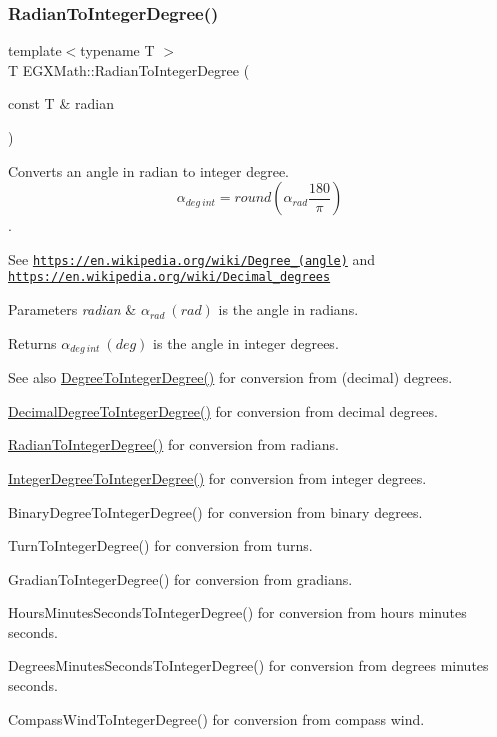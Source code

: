 \subsubsection{\texorpdfstring{Radian\+To\+Integer\+Degree()}{RadianToIntegerDegree()}}
{\footnotesize\ttfamily template$<$typename T $>$ \\
T E\+G\+X\+Math\+::\+Radian\+To\+Integer\+Degree (\begin{DoxyParamCaption}\item[{const T \&}]{radian }\end{DoxyParamCaption})}



Converts an angle in radian to integer degree. \[\alpha_{deg\ int}=round(\alpha_{rad}\frac{180}{\pi})\]. 

See \href{https://en.wikipedia.org/wiki/Degree_(angle)}{\tt https\+://en.\+wikipedia.\+org/wiki/\+Degree\+\_\+(angle)} and \href{https://en.wikipedia.org/wiki/Decimal_degrees}{\tt https\+://en.\+wikipedia.\+org/wiki/\+Decimal\+\_\+degrees} 
\begin{DoxyParams}{Parameters}
{\em radian} & $\alpha_{rad}\ (rad)$ is the angle in radians. \\
\hline
\end{DoxyParams}
\begin{DoxyReturn}{Returns}
$\alpha_{deg\ int}\ (deg)$ is the angle in integer degrees. 
\end{DoxyReturn}
\begin{DoxySeeAlso}{See also}
\mbox{\hyperlink{group___e_g_x_math-_angle_conversions-_degree_gaabd20f21be3c18ee423d0bc1a677c6f6}{Degree\+To\+Integer\+Degree()}} for conversion from (decimal) degrees. 

\mbox{\hyperlink{group___e_g_x_math-_angle_conversions-_decimal_degree_ga115239ea7202dbc6a6c9fba68e0ac189}{Decimal\+Degree\+To\+Integer\+Degree()}} for conversion from decimal degrees. 

\mbox{\hyperlink{group___e_g_x_math-_angle_conversions-_radian_gac84796dfdeb56235e1e338522a5f9350}{Radian\+To\+Integer\+Degree()}} for conversion from radians. 

\mbox{\hyperlink{group___e_g_x_math-_angle_conversions-_integer_degree_gac9e870bdfa60dd2bb61469fdf6eedd7c}{Integer\+Degree\+To\+Integer\+Degree()}} for conversion from integer degrees. 

Binary\+Degree\+To\+Integer\+Degree() for conversion from binary degrees. 

Turn\+To\+Integer\+Degree() for conversion from turns. 

Gradian\+To\+Integer\+Degree() for conversion from gradians. 

Hours\+Minutes\+Seconds\+To\+Integer\+Degree() for conversion from hours minutes seconds. 

Degrees\+Minutes\+Seconds\+To\+Integer\+Degree() for conversion from degrees minutes seconds. 

Compass\+Wind\+To\+Integer\+Degree() for conversion from compass wind. 
\end{DoxySeeAlso}
